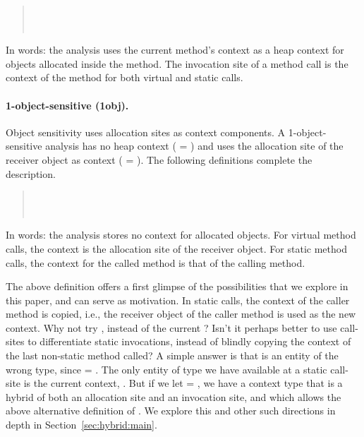 \begin{quote}
 \\
 \\
\end{quote}

In words: the analysis uses the current method's context as a heap context for objects allocated inside the method. The invocation site of a method call is the context of the method for both virtual and static calls.

\paragraph{1-object-sensitive (1obj).}
Object sensitivity uses allocation sites as context components. A 1-object-sensitive analysis has no heap context ( = \args{\{$\star$\}}) and uses the allocation site of the receiver object as context ( = ). The following definitions complete the description. 

\begin{quote}
 \\
 \\
\end{quote}

In words: the analysis stores no context for allocated objects. For virtual method calls, the context is the allocation site of the receiver object. For static method calls, the context for the called method is that of the calling method.

The above definition offers a first glimpse of the possibilities that we explore in this paper, and can serve as motivation. In static calls, the context of the caller method is copied, i.e., the receiver object of the caller method is used as the new context. Why not try , instead of the current ?  Isn't it perhaps better to use call-sites to differentiate static invocations, instead of blindly copying the context of the last non-static method called? A simple answer is that  is an entity of the wrong type, since  = . The only entity of type  we have available at a static call-site is the current context, . But if we let  = , we have a context type that is a hybrid of both an allocation site and an invocation site, and which allows the above alternative definition of . We explore this and other such directions in depth in Section~\ref{sec:hybrid:main}.

